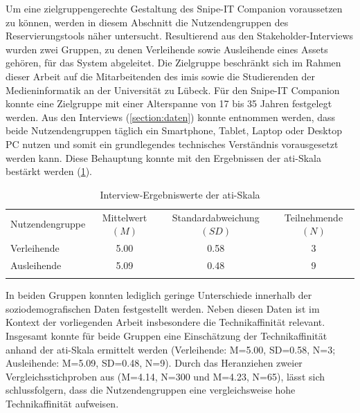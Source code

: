\label{section:Nutzenden}
Um eine zielgruppengerechte Gestaltung des Snipe-IT Companion voraussetzen zu
können, werden in diesem Abschnitt die Nutzendengruppen des Reservierungstools
näher untersucht. Resultierend aus den Stakeholder-Interviews wurden zwei
Gruppen, zu denen Verleihende sowie Ausleihende eines Assets gehören, für das
System abgeleitet. Die Zielgruppe beschränkt sich im Rahmen dieser Arbeit auf
die Mitarbeitenden des \ac{imis} sowie die Studierenden der Medieninformatik an
der Universität zu Lübeck. Für den Snipe-IT Companion konnte eine Zielgruppe mit
einer Alterspanne von 17 bis 35 Jahren festgelegt werden. Aus den Interviews
(\ref{section:daten}) konnte entnommen werden, dass beide Nutzendengruppen
täglich ein Smartphone, Tablet, Laptop oder Desktop PC nutzen und somit ein
grundlegendes technisches Verständnis vorausgesetzt werden kann. Diese
Behauptung konnte mit den Ergebnissen der \ac{ati}-Skala bestärkt werden
(\ref{table:ati}).

\begin{table}[h]
        \centering
        \caption{Interview-Ergebniswerte der \ac{ati}-Skala}
        \begin{tabular}{lccc}
                \arrayrulecolor{maincolor}\hline
                \sffamily\color{maincolor}Nutzendengruppe &
                \sffamily\color{maincolor}Mittelwert $(M)$
                                                          & \sffamily\color{maincolor}Standardabweichung $(SD)$ &
                \sffamily\color{maincolor}Teilnehmende $(N)$
                \\
                \arrayrulecolor{maincolor}\hline
                Verleihende                               & 5.00
                                                          & 0.58                                                & 3
                \\
                Ausleihende                               & 5.09
                                                          & 0.48                                                & 9
                \\
                \arrayrulecolor{maincolor}\hline
        \end{tabular}
        \label{table:ati}
\end{table}

In beiden Gruppen konnten lediglich geringe Unterschiede innerhalb der
soziodemografischen Daten festgestellt werden. Neben diesen Daten ist im Kontext
der vorliegenden Arbeit insbesondere die Technikaffinität relevant. Insgesamt
konnte für beide Gruppen eine Einschätzung der Technikaffinität anhand der
\ac{ati}-Skala ermittelt werden (Verleihende: M=5.00, SD=0.58, N=3; Ausleihende:
M=5.09, SD=0.48, N=9). Durch das Heranziehen zweier Vergleichsstichproben aus
 (M=4.14, N=300 und M=4.23, N=65), lässt sich
schlussfolgern, dass die Nutzendengruppen eine vergleichsweise hohe
Technikaffinität aufweisen.


